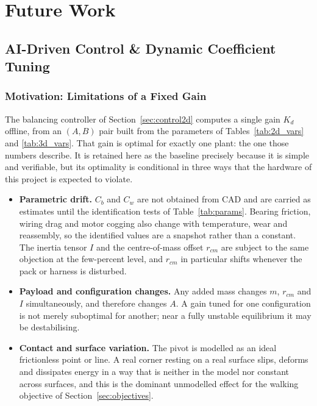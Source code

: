 \section{Future Work}



\subsection{AI-Driven Control \& Dynamic Coefficient Tuning}
\label{sec:ai_control}

\subsubsection{Motivation: Limitations of a Fixed Gain}

The balancing controller of Section~\ref{sec:control2d} computes a single
gain $K_d$ offline, from an $(A,B)$ pair built from the parameters of
Tables~\ref{tab:2d_vars} and \ref{tab:3d_vars}. That gain is optimal for
exactly one plant: the one those numbers describe. It is retained here as the
baseline precisely because it is simple and verifiable, but its optimality is
conditional in three ways that the hardware of this project is expected to
violate.

\begin{itemize}
    \item \textbf{Parametric drift.} $C_b$ and $C_w$ are not obtained from
    CAD and are carried as estimates until the identification tests of
    Table~\ref{tab:params}. 
    Bearing friction,
    wiring drag and motor cogging also change with temperature, wear and
    reassembly, so the identified values are a snapshot rather than a
    constant. The inertia tensor $I$ and the centre-of-mass offset $r_{cm}$
    are subject to the same objection at the few-percent level, and $r_{cm}$
    in particular shifts whenever the pack or harness is disturbed.
    \item \textbf{Payload and configuration changes.} Any added mass changes
    $m$, $r_{cm}$ and $I$ simultaneously, and therefore changes $A$. A gain
    tuned for one configuration is not merely suboptimal for another; near a
    fully unstable equilibrium it may be destabilising.
    \item \textbf{Contact and surface variation.} The pivot is modelled as an
    ideal frictionless point or line. A real corner resting on a real surface
    slips, deforms and dissipates energy in a way that is neither in the model
    nor constant across surfaces, and this is the dominant unmodelled effect
    for the walking objective of Section~\ref{sec:objectives}.
\end{itemize}

